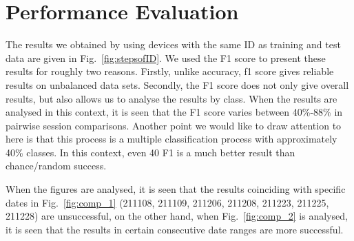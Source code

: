 \documentclass[journal]{IEEEtran}
\begin{document}
\section{Performance Evaluation}
The results we obtained by using devices with the same ID as training and test data are given in Fig.~\ref{fig:stepsofID}.  We used the F1 score to present these results for roughly two reasons. Firstly, unlike accuracy, f1 score gives reliable results on unbalanced data sets. Secondly, the F1 score does not only give overall results, but also allows us to analyse the results by class. When the results are analysed in this context, it is seen that the F1 score varies between 40\%-88\% in pairwise session comparisons. Another point we would like to draw attention to here is that this process is a multiple classification process with approximately 40\% classes. In this context, even 40 F1 is a much better result than chance/random success.


When the figures are analysed, it is seen that the results coinciding with specific dates in Fig.~\ref{fig:comp_1} (211108, 211109, 211206, 211208, 211223, 211225, 211228) are unsuccessful, on the other hand, when Fig.~\ref{fig:comp_2} is analysed, it is seen that the results in certain consecutive date ranges are more successful.
\end{document}
